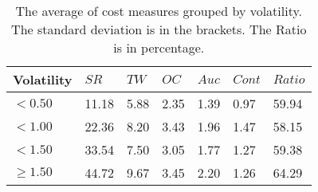 \begin{table}
\centering
\caption{The average of cost measures grouped by volatility. The standard deviation is in the brackets. The Ratio is in percentage.
}
\label{tbl:cost_report}
\begin{tabular}{lllllll}
\toprule
 Volatility &  $SR$ & $TW$ & $OC$ & $Auc$ & $Cont$ & $Ratio$ \\
\midrule
    $<0.50$ & 11.18 & 5.88 & 2.35 &  1.39 &   0.97 &   59.94 \\
    $<1.00$ & 22.36 & 8.20 & 3.43 &  1.96 &   1.47 &   58.15 \\
    $<1.50$ & 33.54 & 7.50 & 3.05 &  1.77 &   1.27 &   59.38 \\
$\geq 1.50$ & 44.72 & 9.67 & 3.45 &  2.20 &   1.26 &   64.29 \\
\bottomrule
\end{tabular}
\end{table}

